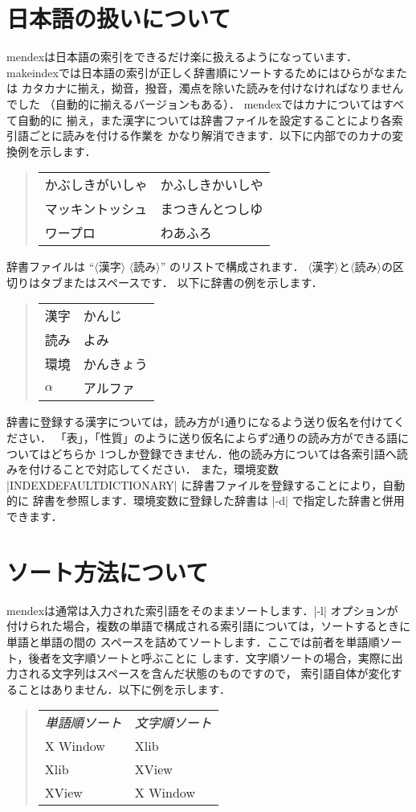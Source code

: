 \documentclass[a4paper]{jsarticle}
\newcommand{\SoftName}[1]{\textsf{#1}}
\newcommand{\jMeta}[1]{$\langle$\mbox{}\textsf{#1}\mbox{}$\rangle$}
\begin{document}
\section{日本語の扱いについて}

\SoftName{mendex}は日本語の索引をできるだけ楽に扱えるようになっています．
\SoftName{makeindex}では日本語の索引が正しく辞書順にソートするためにはひらがなまたは
カタカナに揃え，拗音，撥音，濁点を除いた読みを付けなければなりませんでした
（自動的に揃えるバージョンもある）． \SoftName{mendex}ではカナについてはすべて自動的に
揃え，また漢字については辞書ファイルを設定することにより各索引語ごとに読みを付ける作業を
かなり解消できます．以下に内部でのカナの変換例を示します．
%
\begin{quote}
\begin{tabular}{ll}
かぶしきがいしゃ & かふしきかいしや \\
マッキントッシュ & まつきんとつしゆ \\
ワープロ & わあふろ
\end{tabular}
\end{quote}

辞書ファイルは ``\jMeta{漢字} \jMeta{読み}'' のリストで構成されます．
\jMeta{漢字}と\jMeta{読み}の区切りはタブまたはスペースです． 以下に辞書の例を示します．
%
\begin{quote}
\begin{tabular}{ll}
漢字 & かんじ \\
読み & よみ \\
環境 & かんきょう \\
$\alpha$ & アルファ
\end{tabular}
\end{quote}

辞書に登録する漢字については，読み方が1通りになるよう送り仮名を付けてください．
「表」，「性質」のように送り仮名によらず2通りの読み方ができる語についてはどちらか
1つしか登録できません．他の読み方については各索引語へ読みを付けることで対応してください．
また，環境変数 |INDEXDEFAULTDICTIONARY| に辞書ファイルを登録することにより，自動的に
辞書を参照します．環境変数に登録した辞書は |-d| で指定した辞書と併用できます．

\section{ソート方法について}

\SoftName{mendex}は通常は入力された索引語をそのままソートします．|-l| オプションが
付けられた場合，複数の単語で構成される索引語については，ソートするときに単語と単語の間の
スペースを詰めてソートします．ここでは前者を単語順ソート，後者を文字順ソートと呼ぶことに
します．文字順ソートの場合，実際に出力される文字列はスペースを含んだ状態のものですので，
索引語自体が変化することはありません．以下に例を示します．
%
\begin{quote}
\begin{tabular}{ll}
\emph{単語順ソート} & \emph{文字順ソート} \\
X Window & Xlib \\
Xlib & XView \\
XView & X Window
\end{tabular}
\end{quote}
\end{document}
